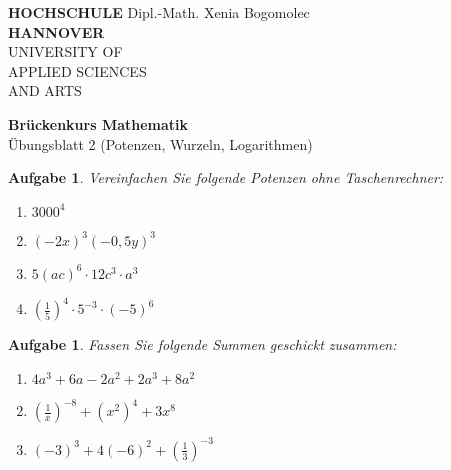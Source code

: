 \documentclass[12pt]{article}
\newtheorem{exercise}[satz]{Aufgabe}
\begin{document}
   \pagestyle{empty}
   \parindent 0cm
   \begin{minipage}{14cm}
   \footnotesize{\textbf{HOCHSCHULE} \hfill Dipl.-Math. Xenia Bogomolec\\
  \textbf{HANNOVER}\\
   UNIVERSITY OF\\
   APPLIED SCIENCES\\
   AND ARTS
   }
   \end{minipage}
   \vspace{1.0cm}

   \begin{center}
     {\Large \bf Br\"uckenkurs Mathematik} \\
     \vspace{0.5cm}
     {\large \"Ubungsblatt 2 (Potenzen, Wurzeln, Logarithmen)}  \\

  \end{center}
   \vspace{0.5cm}
   \normalsize
   \parindent0cm
   
  \begin{exercise}
  Vereinfachen Sie folgende Potenzen ohne Taschenrechner:
  \begin{multicols}{2}
  \begin{enumerate}
  \item[(a)] $3000^4$
  \item[(b)] $(-2x)^3(-0,5y)^3$
  \item[(c)] $5(ac)^6 \cdot 12c^3 \cdot a^3$
  \item[(d)] $(\frac{1}{5})^4 \cdot 5^{-3} \cdot (-5)^6$
  \end{enumerate}
  \end{multicols}
   \end{exercise}

   \vspace{0.1cm}

  \begin{exercise}
  Fassen Sie folgende Summen geschickt zusammen:
  \begin{enumerate}
  \item[(a)] $4a^3+6a-2a^2+2a^3+8a^2$
  \item[(b)] $(\frac{1}{x})^{-8}+(x^2)^4+3x^8$
  \item[(d)] $(-3)^3+4(-6)^2+(\frac{1}{3})^{-3}$ 
  \end{enumerate}
   \end{exercise}

   \vspace{0.1cm}
   
\end{document}
